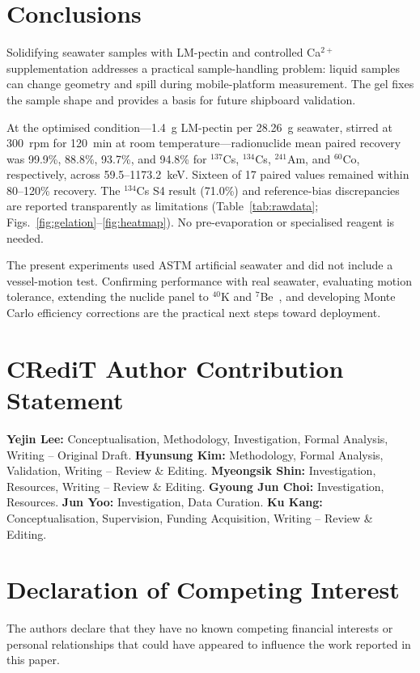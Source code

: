\documentclass[preprint,12pt]{elsarticle}
\begin{document}
\section{Conclusions}

Solidifying seawater samples with LM-pectin and controlled Ca$^{2+}$
supplementation addresses a practical sample-handling problem:
liquid samples can change geometry and spill during mobile-platform
measurement. The gel fixes the sample shape and provides a basis for
future shipboard validation.

At the optimised condition---1.4~g LM-pectin per 28.26~g seawater,
stirred at 300~rpm for 120~min at room temperature---radionuclide
mean paired recovery was
99.9\%, 88.8\%, 93.7\%, and 94.8\% for $^{137}$Cs, $^{134}$Cs,
$^{241}$Am, and $^{60}$Co, respectively, across 59.5--1173.2~keV.
Sixteen of 17 paired values remained within 80--120\% recovery.
The $^{134}$Cs S4 result (71.0\%) and reference-bias discrepancies are
reported transparently as limitations (Table~\ref{tab:rawdata};
Figs.~\ref{fig:gelation}--\ref{fig:heatmap}).
No pre-evaporation or specialised reagent is needed.

The present experiments used ASTM artificial seawater and did not
include a vessel-motion test. Confirming performance with real seawater,
evaluating motion tolerance, extending the nuclide panel to $^{40}$K
and $^{7}$Be~\cite{Bae2025}, and developing Monte Carlo efficiency
corrections are the practical next steps toward deployment.


\nolinenumbers
\section*{CRediT Author Contribution Statement}
\textbf{Yejin Lee:} Conceptualisation, Methodology, Investigation,
Formal Analysis, Writing -- Original Draft.
\textbf{Hyunsung Kim:} Methodology, Formal Analysis, Validation,
Writing -- Review \& Editing.
\textbf{Myeongsik Shin:} Investigation, Resources, Writing -- Review \& Editing.
\textbf{Gyoung Jun Choi:} Investigation, Resources.
\textbf{Jun Yoo:} Investigation, Data Curation.
\textbf{Ku Kang:} Conceptualisation, Supervision, Funding Acquisition,
Writing -- Review \& Editing.

\section*{Declaration of Competing Interest}
The authors declare that they have no known competing financial
interests or personal relationships that could have appeared to
influence the work reported in this paper.
\end{document}
